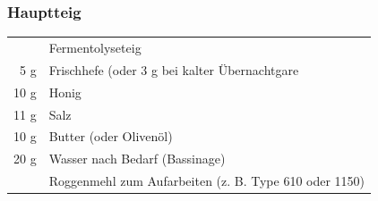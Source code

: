 \subsubsection*{Hauptteig}
\begin{tabular}{r l}
    & Fermentolyseteig                                      \\
    5 g & Frischhefe (oder 3 g bei kalter Übernachtgare         \\
    10 g & Honig  \\
    11 g & Salz                                                  \\
    10 g & Butter (oder Olivenöl)                                \\
    20 g & Wasser nach Bedarf (Bassinage)                        \\
    & Roggenmehl zum Aufarbeiten (z. B. Type 610 oder 1150)
\end{tabular}\\


